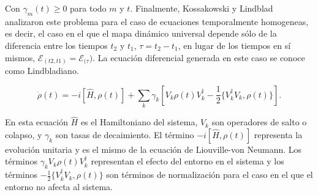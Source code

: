 Con $\gamma_m(t) \geq 0$ para todo $m$ y $t$. Finalmente, Kossakowski \cite{Kossakowski_1972} y Lindblad \cite{Lindblad_1976} analizaron este problema para el caso de ecuaciones temporalmente homogeneas, es decir, el caso en el que el mapa dinámico universal depende sólo de la diferencia entre los tiempos $t_2$ y $t_1$, $\tau = t_2 - t_1$, en lugar de los tiempos en sí mismos, $\mathcal{E}_{(t2, t1)} = \mathcal{E}_{(\tau})$. La ecuación diferencial generada en este caso se conoce como Lindbladiano.

\begin{equation}
    \dot{\rho}(t) = -i [\hat{H}, \rho(t)] + \sum_k \gamma_k [V_k \rho(t) V_k^\dagger - \frac{1}{2} \{V_k^\dagger V_k, \rho(t)\}] .
\end{equation}

En esta ecuación $\hat{H}$ es el Hamiltoniano del sistema, $V_k$ son operadores de salto o colapso, y $\gamma_k$ son tasas de decaimiento. El término $-i [\hat{H}, \rho(t)]$ representa la evolución unitaria y es el mismo de la ecuación de Liouville-von Neumann. Los términos $\gamma_k V_k \rho(t) V_k^\dagger$ representan el efecto del entorno en el sistema y los términos $-\frac{1}{2} \{V_k^\dagger V_k, \rho(t)\}$ son términos de normalización para el caso en el que el entorno no afecta al sistema.



